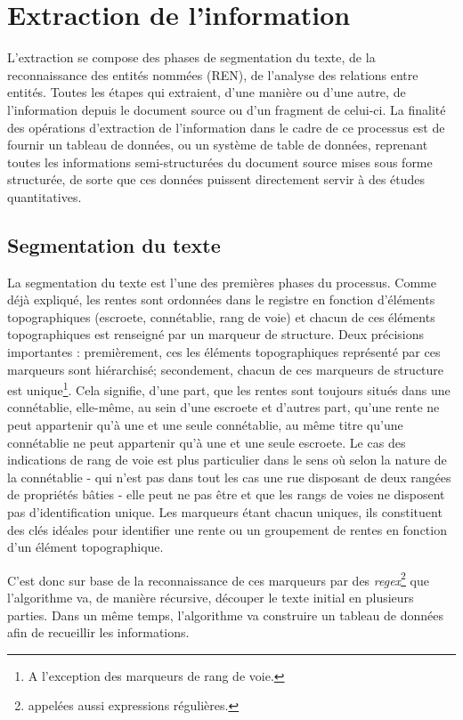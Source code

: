 \section{Extraction de l'information}
L'extraction se compose des phases de segmentation du texte, de la reconnaissance des entités nommées (REN), de l'analyse des relations entre entités. Toutes les étapes qui extraient, d'une manière ou d'une autre, de l'information depuis le document source ou d'un fragment de celui-ci. 
La finalité des opérations d'extraction de l'information dans le cadre de ce processus est de fournir un tableau de données, ou un système de table de données, reprenant toutes les informations semi-structurées du document source mises sous forme structurée, de sorte que ces données puissent directement servir à des études quantitatives.

\subsection{Segmentation du texte}
La segmentation du texte est l'une des premières phases du processus. Comme déjà expliqué, les rentes sont ordonnées dans le registre en fonction d'éléments topographiques (escroete, connétablie, rang de voie) et chacun de ces éléments topographiques est renseigné par un marqueur de structure. Deux précisions  importantes : premièrement, ces les éléments topographiques représenté par ces marqueurs sont hiérarchisé; secondement, chacun de ces marqueurs de structure est unique\footnote{A l'exception des marqueurs de rang de voie.}.
Cela signifie, d'une part, que les rentes sont toujours situés dans une connétablie, elle-même, au sein d'une escroete et d'autres part, qu'une rente ne peut appartenir qu'à une et une seule connétablie, au même titre qu'une connétablie ne peut appartenir qu'à une et une seule escroete.
Le cas des indications de rang de voie est plus particulier dans le sens où selon la nature de la connétablie - qui n'est pas dans tout les cas une rue disposant de deux rangées de propriétés bâties - elle peut ne pas être et que les rangs de voies ne disposent pas d'identification unique.
Les marqueurs étant chacun uniques, ils constituent des clés idéales pour identifier une rente ou un groupement de rentes en fonction d'un élément topographique. 

C'est donc sur base de la reconnaissance de ces marqueurs par des \textit{regex}\footnote{appelées aussi \og expressions régulières\fg{}.} que l'algorithme va, de manière récursive, découper le texte initial en plusieurs parties. Dans un même temps, l'algorithme va construire un tableau de données afin de  recueillir les informations. 

